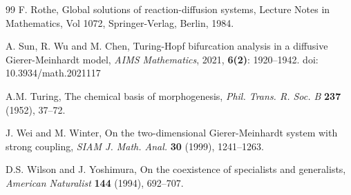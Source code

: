 \documentclass[leqno,12pt]{article}
\numberwithin{equation}{section}
\begin{document}
\begin{thebibliography}{99}
 F. Rothe, Global solutions of reaction-diffusion systems,  Lecture Notes in
Mathematics, Vol 1072, Springer-Verlag, Berlin, 1984. 

 A. Sun, R. Wu and  M. Chen, Turing-Hopf bifurcation analysis in a diffusive Gierer-Meinhardt model,  {\it AIMS Mathematics}, 2021, {\bf 6(2)}: 1920--1942. doi: 10.3934/math.2021117

 A.M. Turing, The chemical basis of morphogenesis,
{\it Phil. Trans. R. Soc. B} {\bf 237} (1952), 37--72.
 
 J. Wei and M. Winter, On the two-dimensional Gierer-Meinhardt system with strong coupling,
{\it SIAM J. Math. Anal.} {\bf 30} (1999), 1241--1263.

 D.S. Wilson and J. Yoshimura, On the coexistence of specialists and generalists,
{\it American Naturalist} {\bf 144} (1994), 692--707.


\end{thebibliography}
\end{document}
